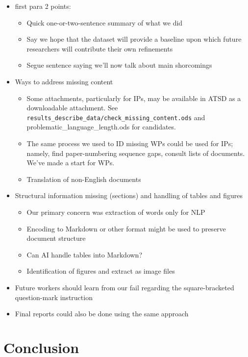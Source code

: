 \documentclass[12pt]{article}
\begin{document}
\begin{itemize}
    \item first para 2 points:
    \begin{itemize}
        \item Quick one-or-two-sentence summary of what we did
        \item Say we hope that the dataset
        will provide a baseline upon which future researchers will contribute
        their own refinements
        \item Segue sentence saying we'll now talk about main shorcomings
    \end{itemize}
    \item Ways to address missing content
    \begin{itemize}
        \item Some attachments, particularly for IPs, may be available in ATSD
        as a downloadable attachment.
        See {\tt results\_describe\_data/check\_missing\_content.ods} 
        and {problematic\_language\_length.ods} for candidates.
        \item The same process we used to ID missing WPs could be used for IPs;
        namely, find paper-numbering sequence gaps, consult lists of documents.
        We've made a start for WPs.
        \item Translation of non-English documents
    \end{itemize}
    \item Structural information missing (sections) and handling of tables and figures
    \begin{itemize}
        \item Our primary concern was extraction of words only for NLP
        \item Encoding to Markdown or other format might be used to 
        preserve document structure
        \item Can AI handle tables into Markdown?
        \item Identification of figures and extract as image files
    \end{itemize}
    \item Future workers should learn from our fail regarding the square-bracketed
    question-mark instruction
    \item Final reports could also be done using the same approach
\end{itemize}

\section{Conclusion}
\end{document}

